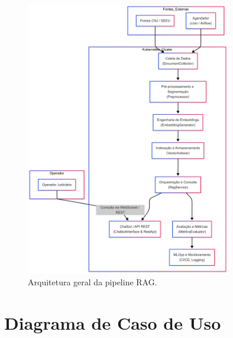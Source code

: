 \begin{description}
\begin{figure}[h!]
  \centering
  \includegraphics[width=0.8\textwidth]{04-figuras/arquitetura_pipeline.png}
  \caption{Arquitetura geral da pipeline RAG.}
  \label{fig:arquitetura_pipeline}
\end{figure}

\section{Diagrama de Caso de Uso}
\label{sec:diagrama-caso-uso}


\end{description}
